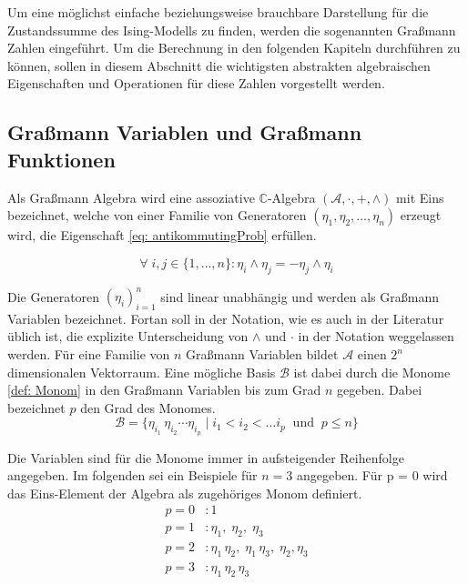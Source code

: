 Um eine möglichst einfache beziehungsweise brauchbare Darstellung für die Zustandssumme des Ising-Modells zu finden, werden die sogenannten Graßmann Zahlen eingeführt. Um die Berechnung in den folgenden Kapiteln durchführen zu können, sollen in diesem Abschnitt die wichtigsten abstrakten algebraischen Eigenschaften und Operationen für diese Zahlen vorgestellt werden. \\

\subsection{Graßmann Variablen und Graßmann Funktionen}

Als Graßmann Algebra wird eine assoziative $\mathbb C$-Algebra $(\mathcal A, \cdot, +, \wedge)$ mit Eins bezeichnet, welche von einer Familie von Generatoren $(\eta_1, \eta_2, \dots, \eta_n)$  erzeugt wird, die Eigenschaft \eqref{eq: antikommutingProb} erfüllen. 

\begin{equation} \label{eq: antikommutingProb}
\forall\;i,j\in\{1,\dots,n\}: \eta_i \wedge \eta_j = - \eta_j \wedge \eta_i
\end{equation}

\noindent Die Generatoren $(\eta_i)_{i=1}^n$ sind linear unabhängig und werden als Graßmann Variablen bezeichnet. Fortan soll in der Notation, wie es auch in der Literatur üblich ist, die explizite Unterscheidung von $\wedge$ und $\cdot$ in der Notation weggelassen werden. Für eine Familie von $n$ Graßmann Variablen bildet $\mathcal A$ einen $2^n$ dimensionalen Vektorraum. Eine mögliche Basis $\mathcal B$ ist dabei durch die Monome \eqref{def: Monom} in den Graßmann Variablen bis zum Grad $n$ gegeben. Dabei bezeichnet $ p $ den Grad des Monomes.
\begin{equation} \label{def: Monom}
    \mathcal B = \{\eta_{i_1}\,  \eta_{i_2}  \cdots \eta_{i_p} \;| \; i_1 < i_2 < \dots i_p \;\;\text{und}\;\; p\leq n \}  
\end{equation}

\noindent Die Variablen sind für die Monome immer in aufsteigender Reihenfolge angegeben. Im folgenden sei ein Beispiele für $n = 3$ angegeben. Für p = 0 wird das Eins-Element der Algebra als zugehöriges Monom definiert. 
\begin{align}
    p = 0 &: 1 \nonumber \\
    p = 1 &: \eta_1,\; \eta_2,\; \eta_3 \nonumber \\
    p = 2 &: \eta_1\,\eta_2,\; \eta_1\,\eta_3,\; \eta_2,\eta_3 \nonumber \\
    p = 3 &: \eta_1\,\eta_2\,\eta_3 \nonumber 
\end{align}



